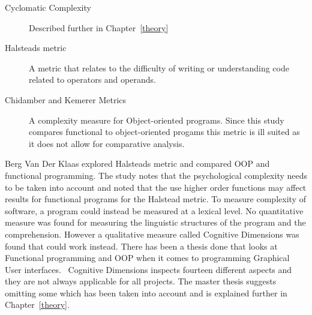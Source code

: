 \begin{description}

    \item [Cyclomatic Complexity] Described further in Chapter~\ref{theory}

    \item [Halsteads metric] A metric that relates to the difficulty of writing
    or understanding code related to operators and operands.~\cite{bergklaas}

    \item [Chidamber and Kemerer Metrics~\cite{chidamber}] A complexity measure
    for Object-oriented programs. Since this study compares functional to
    object-oriented progams this metric is ill suited as it does not allow for
    comparative analysis.

\end{description}

Berg Van Der Klaas explored Halsteads metric and compared OOP and functional
programming. The study notes that the psychological complexity needs to be taken
into account and noted that the use higher order functions may affect results
for functional programs for the Halstead metric. To measure complexity of
software, a program could instead be measured at a lexical level. No
quantitative measure was found for measuring the linguistic structures of the
program and the comprehension. However a qualitative measure called Cognitive
Dimensions was found that could work instead. There has been a thesis done that
looks at Functional programming and OOP when it comes to programming Graphical
User interfaces.~\cite{euguenkiss} Cognitive Dimensions inspects
fourteen different aspects and they are not always applicable for all projects.
The master thesis suggests omitting some which has been taken into account and
is explained further in Chapter~\ref{theory}.

